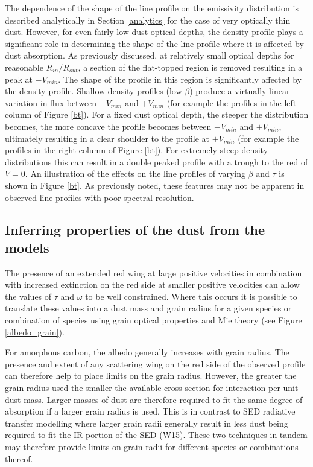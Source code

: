The dependence of the shape of the line profile on the emissivity 
distribution is described analytically in Section \ref{analytics} for the 
case of very optically thin dust.  However, for even fairly low dust 
optical depths, the density profile plays a significant role in 
determining the shape of the line profile where it is affected by dust 
absorption.  As previously discussed, at relatively small optical depths 
for reasonable $R_{in}/R_{out}$, a section of the flat-topped region is 
removed resulting in a peak at $-V_{min}$.  The shape of the profile in 
this region is significantly affected by the density profile.  Shallow 
density profiles (low $\beta$) produce a virtually linear variation in 
flux between $-V_{min}$ and $+V_{min}$ (for example the profiles in the 
left column of Figure \ref{bt}).  For a fixed dust optical depth, the 
steeper the distribution becomes, the more concave the profile becomes 
between $-V_{min}$ and $+V_{min}$, ultimately resulting in a clear 
shoulder to the profile at $+V_{min}$ (for example the profiles in the 
right column of Figure \ref{bt}).  For extremely steep density 
distributions this can result in a double peaked profile with a trough to 
the red of $V=0$.  An illustration of the effects on the line profiles of 
varying $\beta$ and $\tau$ is shown in Figure \ref{bt}.  As previously 
noted, these features may not be apparent in observed line profiles with 
poor spectral resolution.

\subsection{Inferring properties of the dust from the models}

The presence of an extended red wing at large positive velocities in 
combination with increased extinction on the red side at smaller positive 
velocities can allow the values of $\tau$ and $\omega$ to be well 
constrained.  Where this occurs it is possible to translate these values into a 
dust mass and grain radius for a given species or combination of 
species using grain optical properties and Mie theory (see Figure 
\ref{albedo_grain}).  


For amorphous carbon, the albedo generally increases with grain radius.  
The presence and extent of any scattering wing on the red side of the 
observed profile can therefore help to place limits on the grain radius.  
However, the greater the grain radius used the smaller the available 
cross-section for interaction per unit dust mass.  Larger masses of dust 
are therefore required to fit the same degree of absorption if a larger 
grain radius is used.  This is in contrast to SED radiative transfer 
modelling where larger grain radii generally result in less dust being 
required to fit the IR portion of the SED (W15).  These two techniques in 
tandem may therefore provide limits on grain radii for different species 
or combinations thereof.

